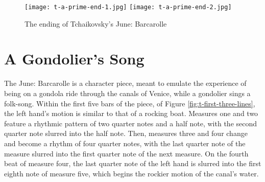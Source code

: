 \begin{figure}
  \centering
  \texttt{[image: t-a-prime-end-1.jpg]}
  \texttt{[image: t-a-prime-end-2.jpg]}
  \caption{The ending of Tchaikovsky's June: Barcarolle}
  \label{fig:t-a-prime-ending}
\end{figure}

\section{A Gondolier's Song}

The June: Barcarolle is a character piece, meant to emulate the experience of being on a gondola ride through the canals of Venice, while a gondolier sings a folk-song. Within the first five bars of the piece, of Figure \ref{fig:t-first-three-lines}\autocite{Henle_2002}, the left hand's motion is similar to that of a rocking boat. Measures one and two feature a rhythmic pattern of two quarter notes and a half note, with the second quarter note slurred into the half note. Then, measures three and four change and become a rhythm of four quarter notes, with the last quarter note of the measure slurred into the first quarter note of the next measure. On the fourth beat of measure four, the last quarter note of the left hand is slurred into the first eighth note of measure five, which begins the rockier motion of the canal's water.

